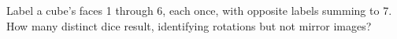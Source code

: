 Label a cube's faces 1 through 6, each once, with opposite labels summing to 7. How many distinct dice result, identifying rotations but not mirror images?
